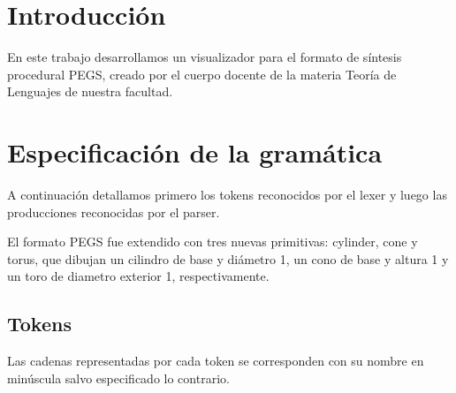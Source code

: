 \documentclass[a4paper, 10pt, twoside]{article}
\begin{document}
\newpage




\section{Introducción}

En este trabajo desarrollamos un visualizador para el formato de síntesis procedural PEGS, creado por el cuerpo docente de la materia Teoría de Lenguajes de nuestra facultad.


\section{Especificación de la gramática}

A continuación detallamos primero los tokens reconocidos por el lexer y luego las producciones reconocidas por el parser.

El formato PEGS fue extendido con tres nuevas primitivas: cylinder, cone y torus, que dibujan un cilindro de base y diámetro 1, un cono de base y altura 1 y un toro de diametro exterior 1, respectivamente.


\subsection{Tokens}

Las cadenas representadas por cada token se corresponden con su nombre en minúscula salvo especificado lo contrario.
\end{document}
